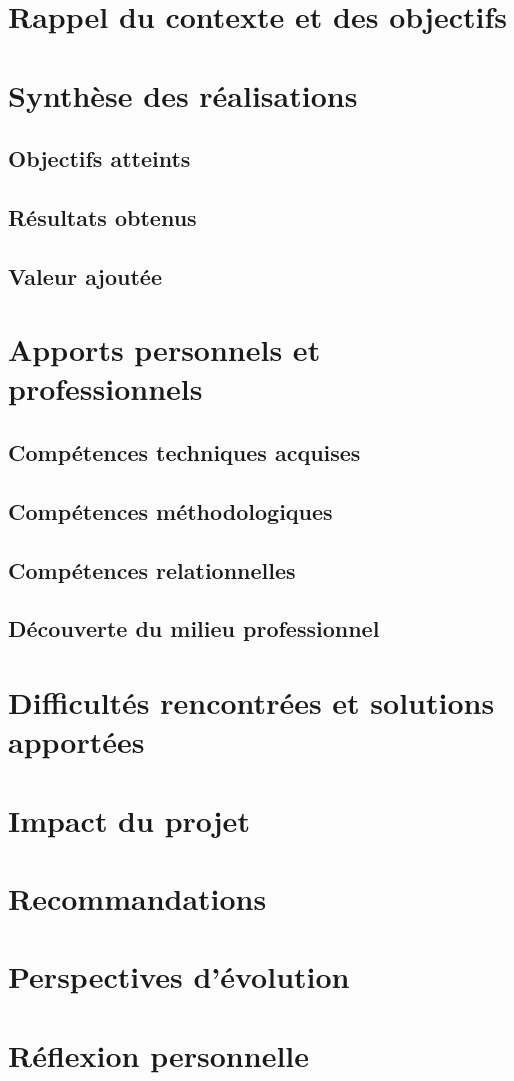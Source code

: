 
\section{Rappel du contexte et des objectifs}

\section{Synthèse des réalisations}

\subsection{Objectifs atteints}

\subsection{Résultats obtenus}

\subsection{Valeur ajoutée}

\section{Apports personnels et professionnels}

\subsection{Compétences techniques acquises}

\subsection{Compétences méthodologiques}

\subsection{Compétences relationnelles}

\subsection{Découverte du milieu professionnel}

\section{Difficultés rencontrées et solutions apportées}

\section{Impact du projet}

\section{Recommandations}

\section{Perspectives d'évolution}

\section{Réflexion personnelle}